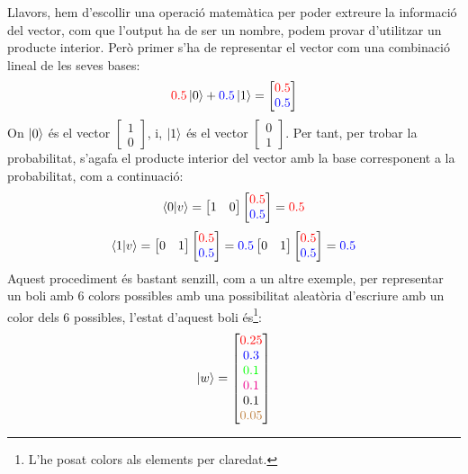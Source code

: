 Llavors, hem d'escollir una operació matemàtica per poder extreure la informació del vector, com que l'output ha de ser un nombre, podem provar d'utilitzar un producte interior. Però primer s'ha de representar el vector com una combinació lineal de les seves bases:
$$
\textcolor{red}{0.5}\ket{0} + \textcolor{blue}{0.5}\ket{1} = \begin{bmatrix}
	\textcolor{red}{0.5} \\
	\textcolor{blue}{0.5}
\end{bmatrix}
$$
On $\ket{0}$ és el vector $\begin{bmatrix} 1 \\ 0\end{bmatrix}$, i, $\ket{1}$ és el vector $\begin{bmatrix} 0 \\ 1 \end{bmatrix}$.
Per tant, per trobar la probabilitat, s'agafa el producte interior del vector amb la base corresponent a la probabilitat, com a continuació:
$$
\bra{0}\ket{v} =
\begin{bmatrix}
	1 &
	0
\end{bmatrix}
\begin{bmatrix}
	\textcolor{red}{0.5} \\
	\textcolor{blue}{0.5}
\end{bmatrix}
= \textcolor{red}{0.5}
$$
$$
\bra{1}\ket{v} =
\begin{bmatrix}
	0 &
	1
\end{bmatrix}
\begin{bmatrix}
	\textcolor{red}{0.5} \\
	\textcolor{blue}{0.5}
\end{bmatrix}
= \textcolor{blue}{0.5}
	\begin{bmatrix}
		0 &
		1
	\end{bmatrix}
	\begin{bmatrix}
		\textcolor{red}{0.5} \\
		\textcolor{blue}{0.5}
	\end{bmatrix}
	= \textcolor{blue}{0.5}
$$
Aquest procediment és bastant senzill, com a un altre exemple, per representar un boli amb 6 colors possibles amb una possibilitat aleatòria d'escriure amb un color dels 6 possibles, l'estat d'aquest boli és\footnote{L'he posat colors als elements per claredat.}:
$$
\ket{w} =
\begin{bmatrix}
	\textcolor{red}{0.25} \\
	\textcolor{blue}{0.3 }\\
	\textcolor{green}{0.1 }\\
	\textcolor{magenta}{0.1 }\\
	\textcolor{black}{0.1 }\\
	\textcolor{brown}{0.05}
\end{bmatrix}
$$
